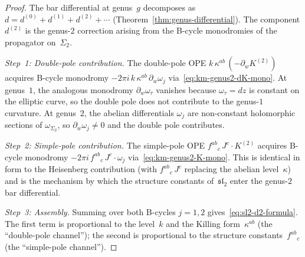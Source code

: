 \begin{proof}
The bar differential at genus~$g$ decomposes as
$d = d^{(0)} + d^{(1)} + d^{(2)} + \cdots$
(Theorem~\ref{thm:genus-differential}). The component $d^{(2)}$ is
the genus-$2$ correction arising from the B-cycle monodromies of the
propagator on~$\Sigma_2$.

\emph{Step~1: Double-pole contribution.}
The double-pole OPE $k\,\kappa^{ab}\, (-\partial_w K^{(2)})$ acquires
B-cycle monodromy $-2\pi i\, k\,\kappa^{ab}\, \partial_w\omega_j$
via~\eqref{eq:km-genus2-dK-mono}. At genus~$1$, the analogous
monodromy $\partial_w\omega_\tau$ vanishes because $\omega_\tau = dz$
is constant on the elliptic curve, so the double pole does not
contribute to the genus-$1$ curvature. At genus~$2$, the abelian
differentials $\omega_j$ are non-constant holomorphic sections of
$\omega_{\Sigma_2}$, so $\partial_w\omega_j \neq 0$ and the double
pole contributes.

\emph{Step~2: Simple-pole contribution.}
The simple-pole OPE $f^{ab}{}_c\, J^c \cdot K^{(2)}$ acquires
B-cycle monodromy $-2\pi i\, f^{ab}{}_c\, J^c \cdot \omega_j$
via~\eqref{eq:km-genus2-K-mono}. This is identical in form to the
Heisenberg contribution (with $f^{ab}{}_c\, J^c$ replacing the abelian
level~$\kappa$) and is the mechanism by which the structure constants
of~$\mathfrak{sl}_2$ enter the genus-$2$ bar differential.

\emph{Step~3: Assembly.}
Summing over both B-cycles $j = 1, 2$
gives~\eqref{eq:sl2-d2-formula}. The first term is proportional to the
level~$k$ and the Killing form~$\kappa^{ab}$ (the ``double-pole
channel''); the second is proportional to the structure
constants~$f^{ab}{}_c$ (the ``simple-pole channel'').
\end{proof}

